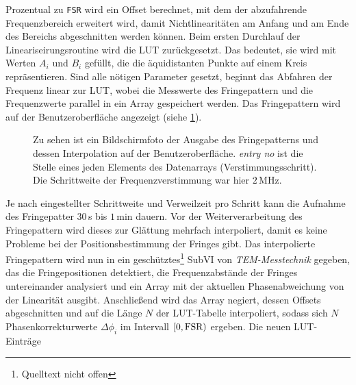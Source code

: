 Prozentual zu \lstinline|FSR| wird ein Offset berechnet, mit dem der abzufahrende Frequenzbereich erweitert wird, damit
Nichtlinearitäten am Anfang und am Ende des Bereichs abgeschnitten werden
können. Beim ersten Durchlauf der Lineariseirungsroutine wird die LUT
zurückgesetzt. Das bedeutet, sie wird mit Werten $A_i$ und $B_i$ gefüllt, die
die äquidistanten Punkte auf einem Kreis repräsentieren. Sind alle nötigen
Parameter gesetzt, beginnt das Abfahren der Frequenz linear zur LUT, wobei die
Messwerte des Fringepattern und die Frequenzwerte parallel in ein Array
gespeichert werden. Das Fringepattern wird auf der
Benutzeroberfläche angezeigt (siehe
\ref{fig:linearisierung_benutzeroberflaeche_fringepattern}).\par
\begin{figure}[h]
 	\centering
	\caption[Benutzeroberfläche Linearisierung -
	Fringepattern]{Zu sehen ist ein Bildschirmfoto der Ausgabe des Fringepatterns
	und dessen Interpolation auf der Benutzeroberfläche.
	\textit{entry no} ist die Stelle eines jeden Elements des
	Datenarrays (Verstimmungsschritt).
	Die Schrittweite der Frequenzverstimmung war hier
	$2\,$MHz.}\label{fig:linearisierung_benutzeroberflaeche_fringepattern}
\end{figure}
Je nach eingestellter Schrittweite und Verweilzeit pro Schritt kann die
Aufnahme des Fringepatter $30\,$s bis $1\,$min dauern. Vor der
Weiterverarbeitung des Fringepattern wird dieses zur Glättung mehrfach interpoliert, damit es keine Probleme bei der Positionsbestimmung der Fringes
gibt. Das interpolierte Fringepattern wird nun in ein
geschütztes\footnote{Quelltext nicht offen} SubVI von \textit{TEM-Messtechnik} gegeben, das die Fringepositionen detektiert, die Frequenzabstände der Fringes
untereinander analysiert und ein Array mit der aktuellen Phasenabweichung von
der Linearität ausgibt. Anschließend wird das Array negiert, dessen Offsets
abgeschnitten und auf die Länge $N$ der LUT-Tabelle interpoliert, sodass sich
$N$ Phasenkorrekturwerte $\Delta\phi_i$ im Intervall
$[0,\text{\lstinline|FSR|})$ ergeben. Die neuen LUT-Einträge
